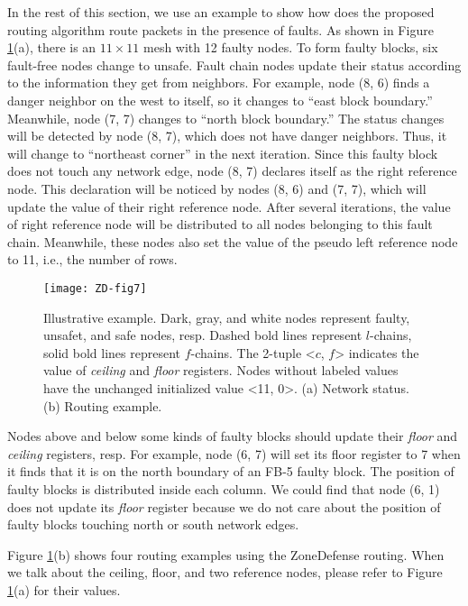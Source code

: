 In the rest of this section, we use an example to show how does the proposed routing algorithm route packets in the presence of faults. As shown in Figure \ref{fig:ZD-fig7}(a), there is an $11 \times 11$ mesh with 12 faulty nodes. To form faulty blocks, six fault-free nodes change to unsafe. Fault chain nodes update their status according to the information they get from neighbors. For example, node (8, 6) finds a danger neighbor on the west to itself, so it changes to “east block boundary.” Meanwhile, node (7, 7) changes to “north block boundary.” The status changes will be detected by node (8, 7), which does not have danger neighbors. Thus, it will change to “northeast corner” in the next iteration. Since this faulty block does not touch any network edge, node (8, 7) declares itself as the right reference node. This declaration will be noticed by nodes (8, 6) and (7, 7), which will update the value of their right reference node. After several iterations, the value of right reference node will be distributed to all nodes belonging to this fault chain. Meanwhile, these nodes also set the value of the pseudo left reference node to 11, i.e., the number of rows.
\begin{figure}[h]
    \centering
        \texttt{[image: ZD-fig7]}
          \caption{Illustrative example. Dark, gray, and white nodes represent faulty, unsafet, and safe nodes, resp. Dashed bold lines represent $l$-chains, solid bold lines represent $f$-chains. The 2-tuple <$c$, $f$> indicates the value of \textit{ceiling} and \textit{floor} registers. Nodes without labeled values have the unchanged initialized value <11, 0>. (a) Network status. (b) Routing example.}
        \label{fig:ZD-fig7}
\end{figure}


Nodes above and below some kinds of faulty blocks should update their \textit{floor} and \textit{ceiling} registers, resp. For example, node (6, 7) will set its floor register to 7 when it finds that it is on the north boundary of an FB-5 faulty block. The position of faulty blocks is distributed inside each column. We could find that node (6, 1) does not update its \textit{floor} register because we do not care about the position of faulty blocks touching north or south network edges.

Figure \ref{fig:ZD-fig7}(b) shows four routing examples using the ZoneDefense routing. When we talk about the ceiling, floor, and two reference nodes, please refer to Figure \ref{fig:ZD-fig7}(a) for their values.

